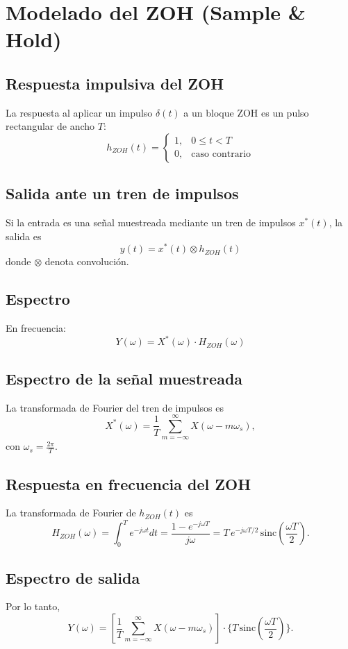 \section*{Modelado del ZOH (Sample \& Hold)}

\subsection*{Respuesta impulsiva del ZOH}
La respuesta al aplicar un impulso $\delta(t)$ a un bloque ZOH es un pulso rectangular de ancho $T$:
\[
h_{ZOH}(t) =
\begin{cases}
1, & 0 \leq t < T \\
0, & \text{caso contrario}
\end{cases}
\]

\subsection*{Salida ante un tren de impulsos}
Si la entrada es una señal muestreada mediante un tren de impulsos $x^*(t)$, la salida es
\[
y(t) = x^*(t) \otimes h_{ZOH}(t)
\]
donde $\otimes$ denota convolución.

\subsection*{Espectro}
En frecuencia:
\[
Y(\omega) = X^*(\omega) \cdot H_{ZOH}(\omega)
\]

\subsection*{Espectro de la señal muestreada}
La transformada de Fourier del tren de impulsos es
\[
X^*(\omega) = \frac{1}{T} \sum_{m=-\infty}^{\infty} X(\omega - m\omega_s),
\]
con $\omega_s = \tfrac{2\pi}{T}$.

\subsection*{Respuesta en frecuencia del ZOH}
La transformada de Fourier de $h_{ZOH}(t)$ es
\[
H_{ZOH}(\omega) = \int_{0}^{T} e^{-j \omega t} dt 
= \frac{1 - e^{-j\omega T}}{j\omega}
= T \, e^{-j \omega T/2} \, \mathrm{sinc}\!\left(\frac{\omega T}{2}\right).
\]

\subsection*{Espectro de salida}
Por lo tanto,
\[
Y(\omega) =
\left[
\frac{1}{T} \sum_{m=-\infty}^{\infty} X(\omega - m\omega_s)
\right]
\cdot
\Bigg\{ T \, \mathrm{sinc}\!\left(\frac{\omega T}{2}\right) \Bigg\}.
\]

